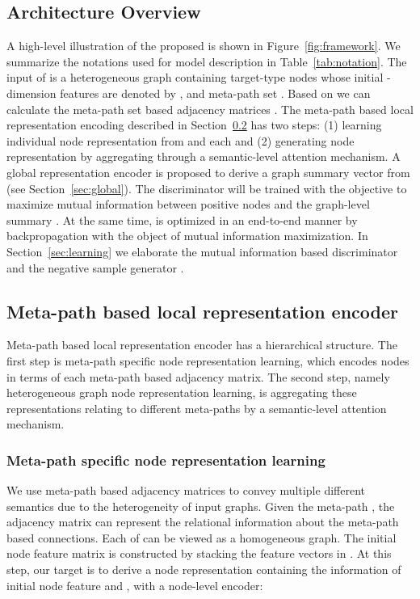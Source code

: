 \documentclass[conference]{IEEEtran}
\begin{document}
\subsection{{\our} Architecture Overview}




	A high-level illustration of the proposed {\our} is shown in Figure~\ref{fig:framework}. 
	We summarize the notations used for model description in Table~\ref{tab:notation}.
	The input of {\our} is a heterogeneous graph  containing  target-type nodes whose initial -dimension features are denoted by , and meta-path set . Based on  we can calculate the meta-path set based adjacency matrices .
	The meta-path based local representation encoding described in Section~\ref{sec:local} has two steps: (1) learning individual node representation  from  and each  and (2) generating node representation  by aggregating  through a semantic-level attention mechanism. A global representation encoder   is proposed to derive a graph summary vector  from  (see Section~\ref{sec:global}). The discriminator  will be trained with the objective to maximize mutual information between positive nodes and the graph-level summary . At the same time, {\our} is optimized in an end-to-end manner by backpropagation with the object of mutual information maximization. In Section~\ref{sec:learning} we elaborate the mutual information based discriminator  and the negative sample generator . 
\subsection{Meta-path based local representation encoder}\label{sec:local}
Meta-path based local representation encoder has a hierarchical structure. The first step is meta-path specific node representation learning, which encodes nodes in terms of each meta-path based adjacency matrix. The second step, namely heterogeneous graph node representation learning, is aggregating these representations relating to different meta-paths by a semantic-level attention mechanism.
	\subsubsection{Meta-path specific node representation learning}
We use meta-path based adjacency matrices to convey multiple different semantics due to the heterogeneity of input graphs. Given the meta-path , the adjacency matrix  can represent the relational information about the meta-path  based connections.
Each of  can be viewed as a homogeneous graph. 
	The initial node feature matrix  is constructed by stacking the feature vectors in . 
	At this step, our target is to derive a node representation containing the information of initial node feature  and , with a node-level encoder:
\end{document}
